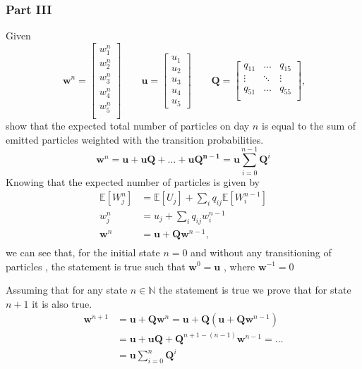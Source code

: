 \documentclass[11pt, a4paper]{article}
\begin{document}
\subsubsection{Part III}
Given 
\[\
\mathbf w^n = \begin{bmatrix}w_1^n\\w_2^n\\w_3^n\\w_4^n\\w_5^n \\ \end{bmatrix} 
\qquad
\mathbf u = \begin{bmatrix}u_1\\u_2\\u_3\\u_4\\u_5\end{bmatrix} \qquad 
\mathbf Q = \begin{bmatrix}q_{11} & \dots & q_{15}  \\ 
\vdots & \ddots & \vdots  \\
q_{51} & \dots & q_{55}  \\

\end{bmatrix},
\]
show that the expected total number of particles on day $n$ is equal to the sum of emitted particles weighted with the transition probabilities.
\[
\mathbf{w}^n = \mathbf u + \mathbf{uQ} + \dots + \mathbf{uQ^{n-1}} = \mathbf u\sum_{i=0}^{n-1} \mathbf Q^i
\]
Knowing that the expected number of particles is given by
\[
\begin{aligned}
\mathbb{E}[W_j^n] &= \mathbb{E}[U_j] + \sum_i q_{ij}\mathbb{E}[W_i^{n-1}] \\
w_j^n &= u_j + \sum_i q_{ij}w_i^{n-1} \\
\mathbf w^n &= \mathbf u + \mathbf Q\mathbf w^{n-1}, \\
\end{aligned}
\]
we can see that, for the initial state $n=0$ and without any transitioning of particles , the statement is true such that $\mathbf w^0 = \mathbf u$ , where $\mathbf w^{-1} = 0$

Assuming that for any state $n\in\mathbb N$ the statement is true we prove that for state $n+1$ it is also true.
\[
\begin{aligned}
\mathbf w^{n+1} &= \mathbf u + \mathbf Q\mathbf w^{n} = \mathbf u + \mathbf Q(\mathbf u + \mathbf Q\mathbf w^{n-1}) \\ 
& =\mathbf u + \mathbf u \mathbf Q + \mathbf Q^{n+1 - (n-1)}\mathbf w^{n-1} = \ldots \\ 
& = \mathbf u \sum_{i=0}^{n} \mathbf Q^i
\end{aligned}
\]
\end{document}
